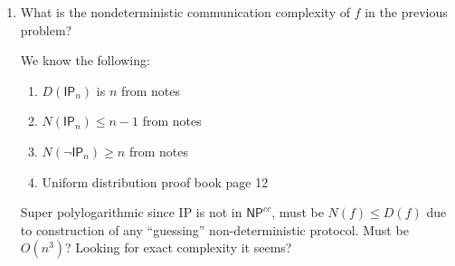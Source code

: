\documentclass[usletter]{article}
\begin{document}
\begin{enumerate}
    TODO double check assumption that this is inner product (because the prime is odd the 0 ~ 1 with $F_2$) \\
    TODO the constant?

    \begin{proof}
      We know the following:

      \begin{enumerate}
        \item $M_{\mathsf{IP}_n} = \left [ \sum_{i=1}^{n} x_i y_i \right ]$ in $\mathbb{F}_2$
        \item $rk_{\mathbb{F}_2}\ M_{\mathsf{IP}_n} = n$
        \item $\forall \mathbb{F}, \mathbb{K}, rk_{\mathbb{F}}\ M = rk_{\mathbb{K}}\ M$ where $\mathbb{F}, \mathbb{K}$ are finite fields.
        \item $\forall \mathbb{F}, f.|fs(f)| \leq (1 + rk_{\mathbb{F}}\ M_f)^2$ where $M_f$ is the characteristic matrix for $f$.
      \end{enumerate}

      From the definition and (a) $f$ has can be seen as $\left [ \sum_{i=1}^{n} x_i y_i \right ]$ in $\mathbb{F}_{18181}$. Then by (b) and (c) we know that $M_f$ has rank $n$ and taken with (d) this implies that the size of the fooling set is certainly no greater than $n^3$.
    \end{proof}


  \item What is the nondeterministic communication complexity of $f$ in the previous problem?

    We know the following:

    \begin{enumerate}
      \item $D(\mathsf{IP}_n)$ is $n$ from notes
      \item $N(\mathsf{IP}_n) \leq n - 1$ from notes
      \item $N(\mathsf{\lnot IP}_n) \geq n$ from notes
      \item Uniform distribution proof book page 12
    \end{enumerate}

    Super polylogarithmic since IP is not in $\mathsf{NP}^{cc}$, must be  $N(f) \leq D(f)$ due to construction of any ``guessing'' non-deterministic protocol. Must be $O(n^3)$? Looking for exact complexity it seems?


\end{enumerate}

\newpage



\end{document}
